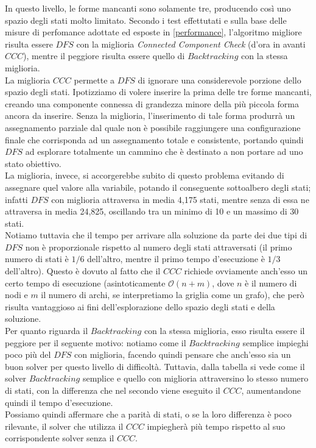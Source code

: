 In questo livello, le forme mancanti sono solamente tre, producendo così uno spazio degli stati molto limitato. Secondo i test effettutati e sulla base delle misure di perfomance adottate ed esposte in \ref{performance}, l'algoritmo migliore risulta essere $DFS$ con la miglioria \textit{Connected Component Check} (d'ora in avanti $CCC$), mentre il peggiore risulta essere quello di $Backtracking$ con la stessa miglioria.\\

La miglioria $CCC$ permette a $DFS$ di ignorare una considerevole porzione dello spazio degli stati. Ipotizziamo di volere inserire la prima delle tre forme mancanti, creando una componente connessa di grandezza minore della più piccola forma ancora da inserire. Senza la miglioria, l'inserimento di tale forma produrrà un assegnamento parziale dal quale non è possibile raggiungere una configurazione finale che corrisponda ad un assegnamento totale e consistente, portando quindi $DFS$ ad esplorare totalmente un cammino che è destinato a non portare ad uno stato obiettivo.\\
La miglioria, invece, si accorgerebbe subito di questo problema evitando di assegnare quel valore alla variabile, potando il conseguente sottoalbero degli stati; infatti $DFS$ con miglioria attraversa in media 4,175 stati, mentre senza di essa ne attraversa in media 24,825, oscillando tra un minimo di 10 e un massimo di 30 stati.\\
Notiamo tuttavia che il tempo per arrivare alla soluzione da parte dei due tipi di $DFS$ non è proporzionale rispetto al numero degli stati attraversati (il primo numero di stati è $1/6$ dell'altro, mentre il primo tempo d'esecuzione è $1/3$ dell'altro). Questo è dovuto al fatto che il $CCC$ richiede ovviamente anch'esso un certo tempo di esecuzione (asintoticamente  $\mathcal{O}(n + m)$, dove $n$ è il numero di nodi e $m$ il numero di archi, se interpretiamo la griglia come un grafo), che però risulta vantaggioso ai fini dell'esplorazione dello spazio degli stati e della soluzione.\\

Per quanto riguarda il $Backtracking$ con la stessa miglioria, esso risulta essere il peggiore per il seguente motivo: notiamo come il $Backtracking$ semplice impieghi poco più del $DFS$ con miglioria, facendo quindi pensare che anch'esso sia un buon solver per questo livello di difficoltà. Tuttavia, dalla tabella si vede come il solver $Backtracking$ semplice e quello con miglioria attraversino lo stesso numero di stati, con la differenza che nel secondo viene eseguito il $CCC$, aumentandone quindi il tempo d'esecuzione.\\
Possiamo quindi affermare che a parità di stati, o se la loro differenza è poco rilevante, il solver che utilizza il $CCC$ impiegherà più tempo rispetto al suo corrispondente solver senza il $CCC$.\\

